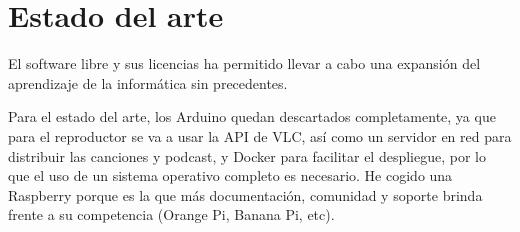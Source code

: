 \chapter{Estado del arte}

El software libre y sus licencias \cite{gplv3} ha permitido llevar a cabo una expansión del
aprendizaje de la informática sin precedentes.

Para el estado del arte, los Arduino quedan descartados completamente, ya que para el reproductor se va a usar la API de VLC, así como un servidor en red para distribuir las canciones y podcast, y Docker para facilitar el despliegue, por lo que el uso de un sistema operativo completo es necesario. He cogido una Raspberry porque es la que más documentación, comunidad y soporte brinda frente a su competencia (Orange Pi, Banana Pi, etc).